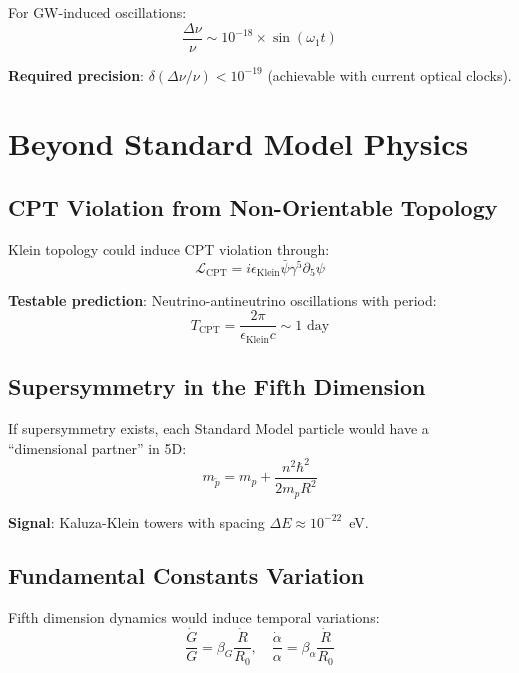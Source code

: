 \documentclass[10pt]{article}
\begin{document}
For GW-induced oscillations:
\begin{equation}
\frac{\Delta \nu}{\nu} \sim 10^{-18} \times \sin(\omega_1 t)
\end{equation}

\textbf{Required precision}: $\delta(\Delta \nu/\nu) < 10^{-19}$ (achievable with current optical clocks).

\section{Beyond Standard Model Physics}

\subsection{CPT Violation from Non-Orientable Topology}

Klein topology could induce CPT violation through:
\begin{equation}
\mathcal{L}_{\text{CPT}} = i \epsilon_{\text{Klein}} \bar{\psi} \gamma^5 \partial_5 \psi
\end{equation}

\textbf{Testable prediction}: Neutrino-antineutrino oscillations with period:
\begin{equation}
T_{\text{CPT}} = \frac{2\pi}{\epsilon_{\text{Klein}} c} \sim 1 \text{ day}
\end{equation}

\subsection{Supersymmetry in the Fifth Dimension}

If supersymmetry exists, each Standard Model particle would have a ``dimensional partner'' in 5D:
\begin{equation}
m_{\tilde{p}} = m_p + \frac{n^2 \hbar^2}{2 m_p R^2}
\end{equation}

\textbf{Signal}: Kaluza-Klein towers with spacing $\Delta E \approx 10^{-22}$~eV.

\subsection{Fundamental Constants Variation}

Fifth dimension dynamics would induce temporal variations:
\begin{equation}
\frac{\dot{G}}{G} = \beta_G \frac{\dot{R}}{R_0}, \quad \frac{\dot{\alpha}}{\alpha} = \beta_\alpha \frac{\dot{R}}{R_0}
\end{equation}
\end{document}
